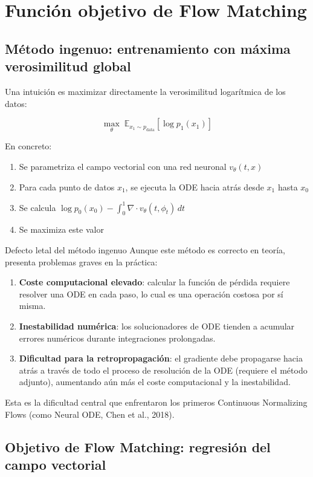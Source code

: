 \section{Función objetivo de Flow Matching}

\subsection{Método ingenuo: entrenamiento con máxima verosimilitud global}

Una intuición es maximizar directamente la verosimilitud logarítmica de los datos:

$$\max_\theta \; \mathbb{E}_{x_1 \sim p_{\text{data}}} \left[ \log p_1(x_1) \right]$$

En concreto:
\begin{enumerate}
    \item Se parametriza el campo vectorial con una red neuronal $v_\theta(t, x)$
    \item Para cada punto de datos $x_1$, se ejecuta la ODE hacia atrás desde $x_1$ hasta $x_0$
    \item Se calcula $\log p_0(x_0) - \int_0^1 \nabla \cdot v_\theta(t, \phi_t) \, dt$
    \item Se maximiza este valor
\end{enumerate}

\begin{warningbox}{Defecto letal del método ingenuo}
Aunque este método es correcto en teoría, presenta problemas graves en la práctica:
\begin{enumerate}
    \item \textbf{Coste computacional elevado}: calcular la función de pérdida requiere resolver una ODE en cada paso, lo cual es una operación costosa por sí misma.
    \item \textbf{Inestabilidad numérica}: los solucionadores de ODE tienden a acumular errores numéricos durante integraciones prolongadas.
    \item \textbf{Dificultad para la retropropagación}: el gradiente debe propagarse hacia atrás a través de todo el proceso de resolución de la ODE (requiere el método adjunto), aumentando aún más el coste computacional y la inestabilidad.
\end{enumerate}
Esta es la dificultad central que enfrentaron los primeros Continuous Normalizing Flows (como Neural ODE, Chen et al., 2018).
\end{warningbox}

\subsection{Objetivo de Flow Matching: regresión del campo vectorial}

